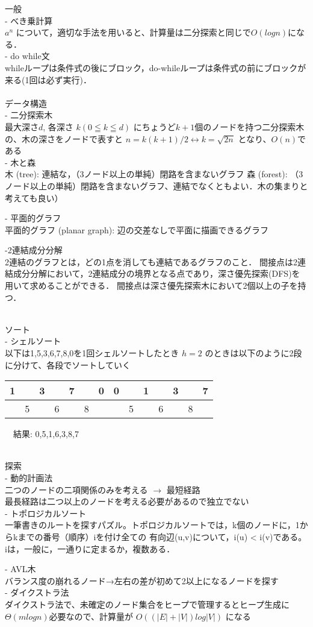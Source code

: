 \documentclass{ltjsarticle}
\begin{document}
一般\\
- べき乗計算\\
$a^n$ について，適切な手法を用いると、計算量は二分探索と同じで$O(log n)$になる．\\

- do while文\\
whileループは条件式の後にブロック，do-whileループは条件式の前にブロックが来る(1回は必ず実行)．\\

\\データ構造\\
- 二分探索木\\
最大深さ$d$, 各深さ $k(0≦k≦d)$ にちょうど$k+1$個のノードを持つ二分探索木の、木の深さをノードで表すと $n=k(k+1)/2 \leftrightarrow k=\sqrt{2n}$ となり、$O(n)$である\\

- 木と森\\
木 (tree): 連結な，（3ノード以上の単純）閉路を含まないグラフ
森 (forest): （3ノード以上の単純）閉路を含まないグラフ、連結でなくともよい．木の集まりと考えても良い）

- 平面的グラフ\\
平面的グラフ (planar graph): 辺の交差なしで平面に描画できるグラフ

-2連結成分分解\\
2連結のグラフとは，どの1点を消しても連結であるグラフのこと．
間接点は2連結成分分解において，2連結成分の境界となる点であり，深さ優先探索(DFS)を用いて求めることができる．
間接点は深さ優先探索木において2個以上の子を持つ．

\\ソート\\
- シェルソート\\
以下は1,5,3,6,7,8,0を1回シェルソートしたとき
$h=2$ のときは以下のように2段に分けて、各段でソートしていく\\
\begin{tabular}{|c|c|c|c|c|c|c||c|c|c|c|c|c|c|}
\hline
1 &  & 3 &  & 7 &  & 0 & 0 &  & 1 &  & 3 &  & 7 \\
\hline
  & 5 &  & 6 &  & 8 &  & & 5 &  & 6 &  & 8 & \\
\hline
\end{tabular}
　結果: 0,5,1,6,3,8,7\\
\vspace{0.5ex}

\\探索\\
- 動的計画法\\
二つのノードの二項関係のみを考える $\rightarrow$ 最短経路\\
最長経路は二つ以上のノードを考える必要があるので独立でない\\

- トポロジカルソート\\
一筆書きのルートを探すパズル。トポロジカルソートでは，k個のノードに，1からkまでの番号（順序）iを付け全ての
有向辺(u,v)について，i(u) < i(v)である。iは，一般に，一通りに定まるか，複数ある．

- AVL木\\
バランス度の崩れるノード→左右の差が初めて2以上になるノードを探す\\

- ダイクストラ法\\
ダイクストラ法で、未確定のノード集合をヒープで管理するとヒープ生成に$Θ(mlogn)$必要なので、計算量が $O((|E|+|V|)log|V|)$ になる\\
\end{document}

